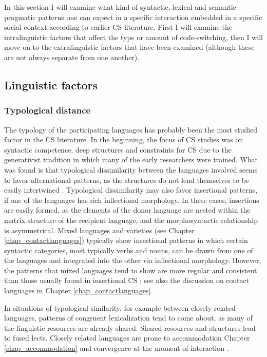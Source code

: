 \documentclass[output=paper]{langscibook}
\begin{document}
In this section I will examine what kind of syntactic, lexical and se\-man\-tic-prag\-mat\-ic patterns one can expect in a specific interaction embedded in a specific social context according to earlier CS literature. First I will examine the intralinguistic factors that affect the type or amount of code-switching, then I will move on to the extralinguistic factors that have been examined (although these are not always separate from one another).

\subsection{Linguistic factors} 

\subsubsection{Typological distance}


The typology of the participating languages has probably been the most studied factor in the CS literature. In the beginning, the focus of CS studies was on syntactic competence, deep structures and constraints for CS due to the generativist tradition in which many of the early researchers were trained. What was found is that typological dissimilarity between the languages involved seems to favor alternational patterns, as the structures do not lend themselves to be easily intertwined \parencite{muysken2000,muysken2013language}. Typological dissimilarity may also favor insertional patterns, if one of the languages has rich inflectional morphology. In these cases, insertions are easily formed, as the elements of the donor language are nested within the matrix structure of the recipient language, and the morphosyntactic relationship is asymmetrical. Mixed languages and varieties (see Chapter \ref{chap_contactlanguages}) typically show insertional patterns in which certain syntactic categories, most typically verbs and nouns, can be drawn from one of the languages and integrated into the other via inflectional morphology. However, the patterns that mixed languages tend to show are more regular and consistent than those usually found in insertional CS \parencite[290]{matras2009language}; see also the discussion on contact languages in Chapter \ref{chap_contactlanguages}. 

In situations of typological similarity, for example between closely related languages, patterns of congruent lexicalization tend to come about, as many of the linguistic resources are already shared. Shared resources and structures lead to fused lects. Closely related languages are prone to accommodation Chapter \ref{chap_accommodation} and convergence at the moment of interaction \parencite{muysken2000,muysken2013language,clyne2003dynamics}.
\end{document}
